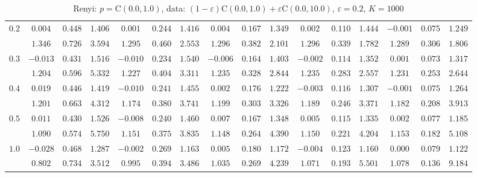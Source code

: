 \documentclass[11pt]{article}
\begin{document}
\begin{table}[ht]
\begin{center}
\begin{tabular}{|c|ccc|ccc|ccc|ccc|ccc|}
\hline 
$0.2$ & $ 0.004 $ & $ 0.448 $ & $ 1.406 $ & $ 0.001 $ & $ 0.244 $ & $ 1.416 $ & $ 0.004 $ & $ 0.167 $ & $ 1.349 $ & $ 0.002 $ & $ 0.110 $ & $ 1.444 $ & $ -0.001 $ & $ 0.075 $ & $ 1.249 $\\ 
 & $ 1.346 $ & $ 0.726 $ & $ 3.594 $ & $ 1.295 $ & $ 0.460 $ & $ 2.553 $ & $ 1.296 $ & $ 0.382 $ & $ 2.101 $ & $ 1.296 $ & $ 0.339 $ & $ 1.782 $ & $ 1.289 $ & $ 0.306 $ & $ 1.806 $\\ 
\hline 
$0.3$ & $ -0.013 $ & $ 0.431 $ & $ 1.516 $ & $ -0.010 $ & $ 0.234 $ & $ 1.540 $ & $ -0.006 $ & $ 0.164 $ & $ 1.403 $ & $ -0.002 $ & $ 0.114 $ & $ 1.352 $ & $ 0.001 $ & $ 0.073 $ & $ 1.317 $\\ 
 & $ 1.204 $ & $ 0.596 $ & $ 5.332 $ & $ 1.227 $ & $ 0.404 $ & $ 3.311 $ & $ 1.235 $ & $ 0.328 $ & $ 2.844 $ & $ 1.235 $ & $ 0.283 $ & $ 2.557 $ & $ 1.231 $ & $ 0.253 $ & $ 2.644 $\\ 
\hline 
$0.4$ & $ 0.019 $ & $ 0.446 $ & $ 1.419 $ & $ -0.010 $ & $ 0.241 $ & $ 1.455 $ & $ 0.002 $ & $ 0.176 $ & $ 1.222 $ & $ -0.003 $ & $ 0.116 $ & $ 1.307 $ & $ -0.001 $ & $ 0.075 $ & $ 1.264 $\\ 
 & $ 1.201 $ & $ 0.663 $ & $ 4.312 $ & $ 1.174 $ & $ 0.380 $ & $ 3.741 $ & $ 1.199 $ & $ 0.303 $ & $ 3.326 $ & $ 1.189 $ & $ 0.246 $ & $ 3.371 $ & $ 1.182 $ & $ 0.208 $ & $ 3.913 $\\ 
\hline 
$0.5$ & $ 0.011 $ & $ 0.430 $ & $ 1.526 $ & $ -0.008 $ & $ 0.240 $ & $ 1.460 $ & $ 0.007 $ & $ 0.167 $ & $ 1.348 $ & $ 0.005 $ & $ 0.115 $ & $ 1.335 $ & $ 0.002 $ & $ 0.077 $ & $ 1.185 $\\ 
 & $ 1.090 $ & $ 0.574 $ & $ 5.750 $ & $ 1.151 $ & $ 0.375 $ & $ 3.835 $ & $ 1.148 $ & $ 0.264 $ & $ 4.390 $ & $ 1.150 $ & $ 0.221 $ & $ 4.204 $ & $ 1.153 $ & $ 0.182 $ & $ 5.108 $\\ 
\hline 
$1.0$ & $ -0.028 $ & $ 0.468 $ & $ 1.287 $ & $ -0.002 $ & $ 0.269 $ & $ 1.163 $ & $ 0.005 $ & $ 0.180 $ & $ 1.172 $ & $ -0.004 $ & $ 0.123 $ & $ 1.160 $ & $ 0.000 $ & $ 0.079 $ & $ 1.122 $\\ 
 & $ 0.802 $ & $ 0.734 $ & $ 3.512 $ & $ 0.995 $ & $ 0.394 $ & $ 3.486 $ & $ 1.035 $ & $ 0.269 $ & $ 4.239 $ & $ 1.071 $ & $ 0.193 $ & $ 5.501 $ & $ 1.078 $ & $ 0.136 $ & $ 9.184 $\\ 
\hline 
\end{tabular}
\caption{Renyi: $p = \mathrm{C}(0.0,1.0)$, data: $(1-\varepsilon)\mathrm{C}(0.0,1.0) + \varepsilon \mathrm{C}(0.0,10.0)$, $\varepsilon =  0.2$, $K = 1000$} 
\end{center}
\end{table}
\end{document}
